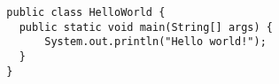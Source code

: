 \documentclass{article}
\begin{document}
\begin{verbatim}
  public class HelloWorld {
    public static void main(String[] args) {
        System.out.println("Hello world!");
    }
  }
\end{verbatim}
\end{document}
